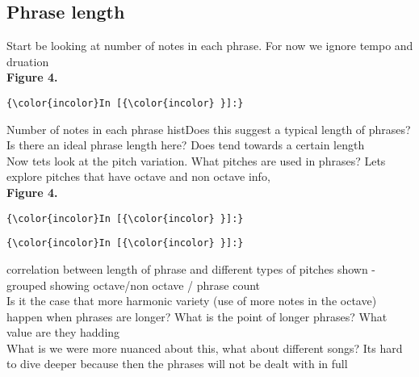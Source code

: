 \documentclass[11pt]{article}
\begin{document}
\subsection{Phrase length}

\noindent
Start be looking at number of notes in each phrase. For now we ignore tempo and druation
\\

\noindent
\textbf{Figure 4.}
\\
    \begin{Verbatim}[commandchars=\\\{\}]
{\color{incolor}In [{\color{incolor} }]:} 
\end{Verbatim}
\vspace{5mm} 
\noindent
Number of notes in each phrase histDoes this suggest a typical length of phrases? Is there an ideal phrase length here? Does tend towards a certain length
\\

\noindent
Now tets look at the pitch variation. What pitches are used in phrases? Lets explore pitches that have octave and non octave info,
\\

\noindent
\textbf{Figure 4.}
\\
    \begin{Verbatim}[commandchars=\\\{\}]
{\color{incolor}In [{\color{incolor} }]:} 
\end{Verbatim}

    \begin{Verbatim}[commandchars=\\\{\}]
{\color{incolor}In [{\color{incolor} }]:} 
\end{Verbatim}
\vspace{5mm} 
\noindent
correlation between length of phrase and different types of pitches shown - grouped showing octave/non octave / phrase count
\\

\noindent
Is it the case that more harmonic variety (use of more notes in the octave) happen when phrases are longer? What is the point of longer phrases? What value are they hadding
\\

\noindent
What is we were more nuanced about this, what about different songs? Its hard to dive deeper because then the phrases will not be dealt with in full
\\
\end{document}
